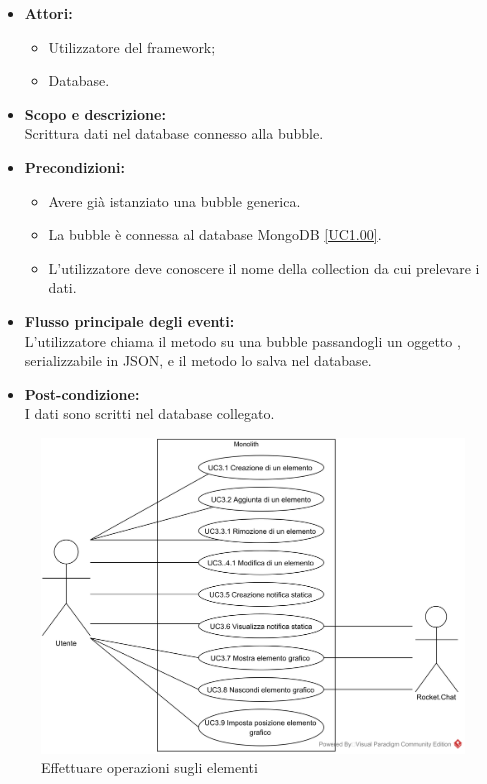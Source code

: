 \begin{itemize}
\item \textbf{Attori:}
\begin{itemize}
	\item Utilizzatore del framework;
	\item Database.
\end{itemize}
\item \textbf{Scopo e descrizione:} 
\\Scrittura dati nel database connesso alla bubble.
\item \textbf{Precondizioni:}
\begin{itemize}
	\item Avere già istanziato una bubble generica.
	\item La bubble è connessa al database MongoDB \ref{UC1.00}.
	\item L'utilizzatore deve conoscere il nome della collection da cui prelevare i dati.
\end{itemize}
\item \textbf{Flusso principale degli eventi:}
\\L'utilizzatore chiama il metodo su una bubble passandogli un oggetto , serializzabile in JSON, e il metodo lo salva nel database.
\item \textbf{Post-condizione:}
\\I dati sono scritti nel database collegato.
\end{itemize}


\begin{figure}[H]
	\centering
	\includegraphics[width=15cm]{../../documenti/AnalisiDeiRequisiti/Diagrammi_img/usecase/operazioni.png}
	\caption{\UCCaption{} Effettuare operazioni sugli elementi}
\end{figure}

